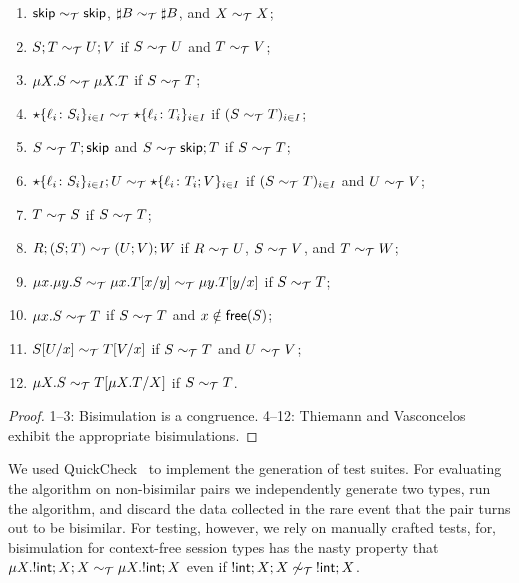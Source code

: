 \begin{theorem}
  \begin{enumerate}
  \item $\mathsf{skip} \sim_\mathcal T \mathsf{skip}$,  $\sharp B \sim_\mathcal T \sharp B$, and
    $X \sim_\mathcal T X$;
  \item $S;T \sim_\mathcal T U;V$ if $S \sim_\mathcal T U$ and $T \sim_\mathcal T V$; 
  \item $\mu X.S \sim_\mathcal T \mu X.T$ if $S \sim_\mathcal T T$; 
  \item $\star\{\ell_i\colon S_i\}_{i\in I}\sim_\mathcal T
    \star\{\ell_i\colon T_i\}_{i\in I}$ if $(S \sim_\mathcal T T)_{i\in
      I}$;
  \item $S\sim_\mathcal T T;\mathsf{skip}$ and $S\sim_\mathcal T \mathsf{skip};T$ if $S \sim_\mathcal T T$;
  \item $\star\{\ell_i\colon S_i\}_{i\in I};U\sim_\mathcal T
    \star\{\ell_i\colon T_i;V\}_{i\in I}$ if $(S \sim_\mathcal T T)_{i\in
      I}$ and $U \sim_\mathcal T V$;
  \item $T \sim_\mathcal T S$ if $S \sim_\mathcal T T$;
  \item $R;(S;T) \sim_\mathcal T (U;V);W$ if $R \sim_\mathcal T U$, $S \sim_\mathcal T V$, and $T\sim_\mathcal T W$;
  \item
    $\mu x.\mu y.S \sim_\mathcal T \mu x.T[{x}/{y}] \sim_\mathcal T \mu y.T[{y}/{x}]$ if $S \sim_\mathcal T T$;
  \item $\mu x.S \sim_\mathcal T T$ if $S \sim_\mathcal T T$ and $x\notin\mathsf{free}(S)$;
  \item $S[{U}/{x}]\sim_\mathcal T T[{V}/{x}]$  if $S \sim_\mathcal T T$ and $U \sim_\mathcal T V$; 
  \item $\mu X.S \sim_\mathcal T T[{\mu X.T}/{X}]$ if $S \sim_\mathcal T T$.
  \end{enumerate}
\end{theorem}
%
\begin{proof}
  1--3: Bisimulation is a congruence. 4--12: Thiemann and
  Vasconcelos~\cite{thiemann2016context} exhibit the appropriate
  bisimulations.
\end{proof}

We used QuickCheck~\cite{DBLP:conf/icfp/ClaessenH00} to implement the
generation of test suites. For evaluating the algorithm on
non-bisimilar pairs we independently generate two types, run the
algorithm, and discard the data collected in the rare event that the
pair turns out to be bisimilar.
%
For testing, however, we rely on manually crafted tests, for,
bisimulation for context-free session types has the nasty property
that $\mu X. !\mathsf{int};X;X \sim_\mathcal T \mu X. !\mathsf{int};X$ even if
$!\mathsf{int};X;X \not\sim_\mathcal T\: !\mathsf{int};X$.

